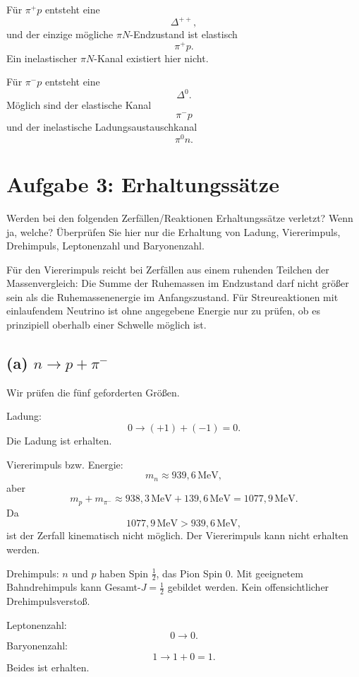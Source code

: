 \documentclass[11pt,a4paper]{scrartcl}
\begin{document}
\begin{answerbox}
Für $\pi^+p$ entsteht eine
\[
\boxed{\Delta^{++}},
\]
und der einzige mögliche $\pi N$-Endzustand ist elastisch
\[
\boxed{\pi^+p}.
\]
Ein inelastischer $\pi N$-Kanal existiert hier nicht.

Für $\pi^-p$ entsteht eine
\[
\boxed{\Delta^0}.
\]
Möglich sind der elastische Kanal
\[
\boxed{\pi^-p}
\]
und der inelastische Ladungsaustauschkanal
\[
\boxed{\pi^0n}.
\]
\end{answerbox}

\section{Aufgabe 3: Erhaltungssätze}

Werden bei den folgenden Zerfällen/Reaktionen Erhaltungssätze verletzt? Wenn ja, welche? Überprüfen Sie hier nur die Erhaltung von Ladung, Viererimpuls, Drehimpuls, Leptonenzahl und Baryonenzahl.

\begin{notebox}
Für den Viererimpuls reicht bei Zerfällen aus einem ruhenden Teilchen der Massenvergleich: Die Summe der Ruhemassen im Endzustand darf nicht größer sein als die Ruhemassenenergie im Anfangszustand. Für Streureaktionen mit einlaufendem Neutrino ist ohne angegebene Energie nur zu prüfen, ob es prinzipiell oberhalb einer Schwelle möglich ist.
\end{notebox}

\subsection*{(a) $n\to p+\pi^-$}

\begin{calculationbox}
Wir prüfen die fünf geforderten Größen.

\begin{calculationbox}
Ladung:
\[
0 \to (+1)+(-1)=0.
\]
Die Ladung ist erhalten.
\end{calculationbox}

\begin{calculationbox}
Viererimpuls bzw. Energie:
\[
m_n\approx 939{,}6\,\mathrm{MeV},
\]
aber
\[
m_p+m_{\pi^-}\approx 938{,}3\,\mathrm{MeV}+139{,}6\,\mathrm{MeV}
=1077{,}9\,\mathrm{MeV}.
\]
Da
\[
1077{,}9\,\mathrm{MeV}>939{,}6\,\mathrm{MeV},
\]
ist der Zerfall kinematisch nicht möglich. Der Viererimpuls kann nicht erhalten werden.
\end{calculationbox}

\begin{calculationbox}
Drehimpuls: $n$ und $p$ haben Spin $\frac12$, das Pion Spin $0$. Mit geeignetem Bahndrehimpuls kann Gesamt-$J=\frac12$ gebildet werden. Kein offensichtlicher Drehimpulsverstoß.

Leptonenzahl:
\[
0\to0.
\]
Baryonenzahl:
\[
1\to1+0=1.
\]
Beides ist erhalten.
\end{calculationbox}
\end{calculationbox}
\end{document}
